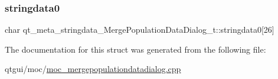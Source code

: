 \subsubsection{\texorpdfstring{stringdata0}{stringdata0}}
{\footnotesize\ttfamily char qt\+\_\+meta\+\_\+stringdata\+\_\+\+Merge\+Population\+Data\+Dialog\+\_\+t\+::stringdata0\mbox{[}26\mbox{]}}



The documentation for this struct was generated from the following file\+:\begin{DoxyCompactItemize}
\item 
qtgui/moc/\mbox{\hyperlink{moc__mergepopulationdatadialog_8cpp}{moc\+\_\+mergepopulationdatadialog.\+cpp}}\end{DoxyCompactItemize}
